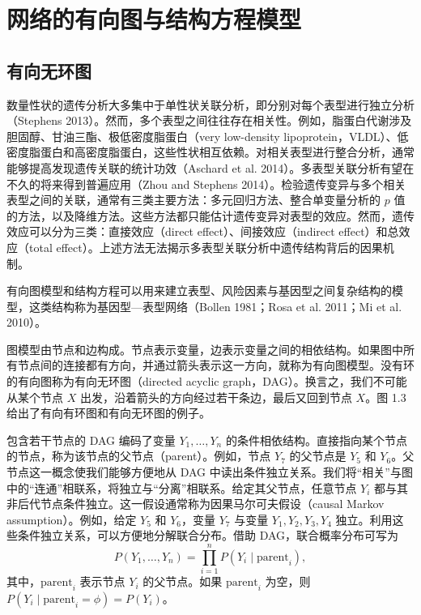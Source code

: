 
\section{网络的有向图与结构方程模型}
\label{sec:ch01b-directed-sem}

\subsection{有向无环图}
\label{sec:ch01b-dags}

数量性状的遗传分析大多集中于单性状关联分析，即分别对每个表型进行独立分析（Stephens 2013）。然而，多个表型之间往往存在相关性。例如，脂蛋白代谢涉及胆固醇、甘油三酯、极低密度脂蛋白（very low-density lipoprotein，VLDL）、低密度脂蛋白和高密度脂蛋白，这些性状相互依赖。对相关表型进行整合分析，通常能够提高发现遗传关联的统计功效（Aschard et al. 2014）。多表型关联分析有望在不久的将来得到普遍应用（Zhou and Stephens 2014）。检验遗传变异与多个相关表型之间的关联，通常有三类主要方法：多元回归方法、整合单变量分析的 $p$ 值的方法，以及降维方法。这些方法都只能估计遗传变异对表型的效应。然而，遗传效应可以分为三类：直接效应（direct effect）、间接效应（indirect effect）和总效应（total effect）。上述方法无法揭示多表型关联分析中遗传结构背后的因果机制。

有向图模型和结构方程可以用来建立表型、风险因素与基因型之间复杂结构的模型，这类结构称为基因型—表型网络（Bollen 1981；Rosa et al. 2011；Mi et al. 2010）。

图模型由节点和边构成。节点表示变量，边表示变量之间的相依结构。如果图中所有节点间的连接都有方向，并通过箭头表示这一方向，就称为有向图模型。没有环的有向图称为有向无环图（directed acyclic graph，DAG）。换言之，我们不可能从某个节点 $X$ 出发，沿着箭头的方向经过若干条边，最后又回到节点 $X$。图 1.3 给出了有向有环图和有向无环图的例子。

\begin{figure}[htbp]
 \centering
 
 \label{fig:ch01b-dag-examples}
\end{figure}

包含若干节点的 DAG 编码了变量 $Y_1,\ldots,Y_n$ 的条件相依结构。直接指向某个节点的节点，称为该节点的父节点（parent）。例如，节点 $Y_7$ 的父节点是 $Y_5$ 和 $Y_6$。父节点这一概念使我们能够方便地从 DAG 中读出条件独立关系。我们将“相关”与图中的“连通”相联系，将独立与“分离”相联系。给定其父节点，任意节点 $Y_i$ 都与其非后代节点条件独立。这一假设通常称为因果马尔可夫假设（causal Markov assumption）。例如，给定 $Y_5$ 和 $Y_6$，变量 $Y_7$ 与变量 $Y_1,Y_2,Y_3,Y_4$ 独立。利用这些条件独立关系，可以方便地分解联合分布。借助 DAG，联合概率分布可写为
\begin{equation}
 P(Y_1,\ldots,Y_n)
 =\prod_{i=1}^{n}P(Y_i\mid\mathrm{parent}_i),
 \tag{1.48}
\end{equation}
其中，$\mathrm{parent}_i$ 表示节点 $Y_i$ 的父节点。如果 $\mathrm{parent}_i$ 为空，则 $P(Y_i\mid\mathrm{parent}_i=\phi)=P(Y_i)$。

